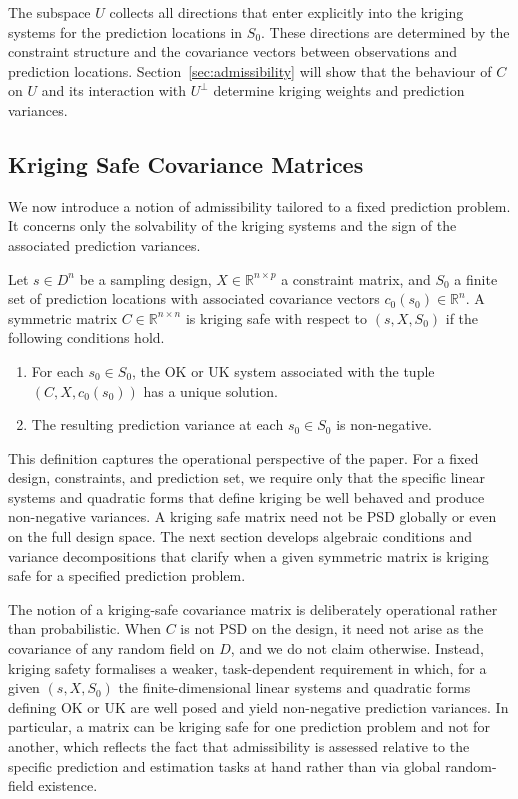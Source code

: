 \documentclass[smallextended]{svjour3}
\newcommand{\R}{\mathbb{R}}
\newcommand{\1}{\mathbf{1}}
\let\oldremark\remark
\let\endoldremark\endremark
\renewenvironment{remark}{\oldremark\upshape}{\endoldremark}
\begin{document}
The subspace $U$ collects all directions that enter explicitly into the kriging systems for the prediction locations in $S_0$. These directions are determined by the constraint structure and the covariance vectors between observations and prediction locations. Section~\ref{sec:admissibility} will show that the behaviour of $C$ on $U$ and its interaction with $U^{\perp}$ determine kriging weights and prediction variances.

\subsection{Kriging Safe Covariance Matrices}
\label{subsec:kriging-safe-matrix}
We now introduce a notion of admissibility tailored to a fixed prediction problem. It concerns only the solvability of the kriging systems and the sign of the associated prediction variances.

\begin{definition}
	\label{def:kriging-safe}
	Let $s \in D^n$ be a sampling design, $X \in \R^{n \times p}$ a constraint matrix, and $S_0$ a finite set of prediction locations with associated covariance vectors $c_0(s_0) \in \R^n$. A symmetric matrix $C \in \R^{n \times n}$ is kriging safe with respect to $(s,X,S_0)$ if the following conditions hold.
	\begin{enumerate}
		\item For each $s_0 \in S_0$, the OK or UK system associated with the tuple $(C,X,c_0(s_0))$ has a unique solution.
		\item The resulting prediction variance at each $s_0 \in S_0$ is non-negative.
	\end{enumerate}
\end{definition}

This definition captures the operational perspective of the paper. For a fixed design, constraints, and prediction set, we require only that the specific linear systems and quadratic forms that define kriging be well behaved and produce non-negative variances. A kriging safe matrix need not be PSD globally or even on the full design space. The next section develops algebraic conditions and variance decompositions that clarify when a given symmetric matrix is kriging safe for a specified prediction problem.
	
\begin{remark}[Operational, not probabilistic]
	\label{rem:kriging-safe-operational}
	The notion of a kriging-safe covariance matrix is deliberately operational 	rather than probabilistic. When $C$ is not PSD on the design, it need not arise as the covariance of any random field on $D$, and we do not claim otherwise. Instead, kriging safety formalises a weaker, task-dependent requirement in which, for a given $(s,X,S_0)$ the finite-dimensional linear systems and quadratic forms defining OK or UK are well posed and yield non-negative prediction variances. In particular, a matrix can be kriging safe for one prediction problem and not for another, which reflects the fact that admissibility is assessed relative to the specific prediction and estimation tasks at hand rather than via global random-field existence.
\end{remark}	
 	
\end{document}

